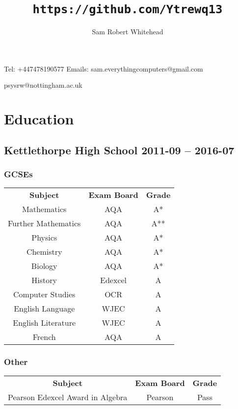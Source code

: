 \documentclass[9pt]{extarticle}
\renewcommand{\maketitle}{\begin{center}\huge\bfseries\theauthor\end{center}\begin{center}\Large\thetitle\end{center}}
\begin{document}
    \title{\texttt{https://github.com/Ytrewq13}}
    \author{Sam Robert Whitehead}

    \maketitle

    Tel: +447478190577
    \hfill
    Emails: sam.everythingcomputers@gmail.com
    \begin{flushright}
        psysrw@nottingham.ac.uk
    \end{flushright}
    \section{Education}
    \subsection{Kettlethorpe High School
    \hfill 2011-09 -- 2016-07}
    \begin{multicols}{2}
        \subsubsection{GCSEs}
        \begin{tabular}{ccc}
            \textbf{Subject} & \textbf{Exam Board} & \textbf{Grade} \\
            Mathematics & AQA & A* \\
            Further Mathematics & AQA & A**\\
            Physics & AQA & A* \\
            Chemistry & AQA & A* \\
            Biology & AQA & A* \\
            History & Edexcel & A \\
            Computer Studies & OCR & A \\
            English Language & WJEC & A \\
            English Literature & WJEC & A \\
            French & AQA & A \\
        \end{tabular}
        \subsubsection{Other}
        \begin{tabular}{ccc}
            \textbf{Subject} & \textbf{Exam Board} & \textbf{Grade} \\
            Pearson Edexcel Award in Algebra & Pearson & Pass \\
        \end{tabular}
    \end{multicols}
\end{document}
